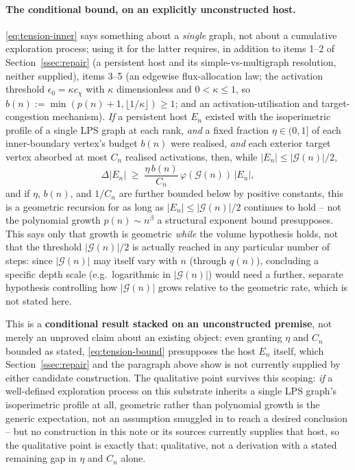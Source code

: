 \documentclass[11pt,a4paper]{article}
\theoremstyle{definition}
\theoremstyle{remark}
\begin{document}
    \paragraph{The conditional bound, on an explicitly unconstructed host.}
    \eqref{eq:tension-inner} says something about a \emph{single} graph, not about a
    cumulative exploration process; using it for the latter requires, in addition to items
    1--2 of Section~\ref{ssec:repair} (a persistent host and its simple-vs-multigraph
    resolution, neither supplied), items 3--5 (an edgewise flux-allocation law; the
    activation threshold $\epsilon_0=\kappa c_\chi$ with $\kappa$ dimensionless and
    $0<\kappa\leq1$, so $b(n):=\min(p(n)+1,\lfloor1/\kappa\rfloor)\geq1$; and an
    activation-utilisation and target-congestion mechanism).
    \emph{If} a persistent host $E_n$ existed with the isoperimetric profile of a single LPS
    graph at each rank, \emph{and} a fixed fraction $\eta\in(0,1]$ of each inner-boundary
    vertex's budget $b(n)$ were realised, \emph{and} each exterior target vertex absorbed at
    most $C_n$ realised activations, then, while $|E_n|\leq|\mathcal G(n)|/2$,
    \begin{equation}
      \label{eq:tension-bound}
      \Delta|E_n| \;\geq\; \frac{\eta\,b(n)}{C_n}\,\varphi(\mathcal G(n))\,|E_n|,
    \end{equation}
    and if $\eta$, $b(n)$, and $1/C_n$ are further bounded below by positive constants, this
    is a geometric recursion for as long as $|E_n|\leq|\mathcal G(n)|/2$ continues to hold --
    not the polynomial growth $p(n)\sim n^\beta$ a structural exponent bound presupposes.
    This says only that growth is geometric \emph{while} the volume hypothesis holds, not that
    the threshold $|\mathcal G(n)|/2$ is actually reached in any particular number of steps:
    since $|\mathcal G(n)|$ may itself vary with $n$ (through $q(n)$), concluding a specific
    depth scale (e.g.\ logarithmic in $|\mathcal G(n)|$) would need a further, separate
    hypothesis controlling how $|\mathcal G(n)|$ grows relative to the geometric rate, which
    is not stated here.

    This is a \textbf{conditional result stacked on an unconstructed premise}, not merely an
    unproved claim about an existing object: even granting $\eta$ and $C_n$ bounded as
    stated, \eqref{eq:tension-bound} presupposes the host $E_n$ itself, which
    Section~\ref{ssec:repair} and the paragraph above show is not currently supplied by either
    candidate construction.
    The qualitative point survives this scoping: \emph{if} a well-defined exploration process
    on this substrate inherits a single LPS graph's isoperimetric profile at all, geometric
    rather than polynomial growth is the generic expectation, not an assumption smuggled in to
    reach a desired conclusion -- but no construction in this note or its sources currently
    supplies that host, so the qualitative point is exactly that: qualitative, not a
    derivation with a stated remaining gap in $\eta$ and $C_n$ alone.
\end{document}
